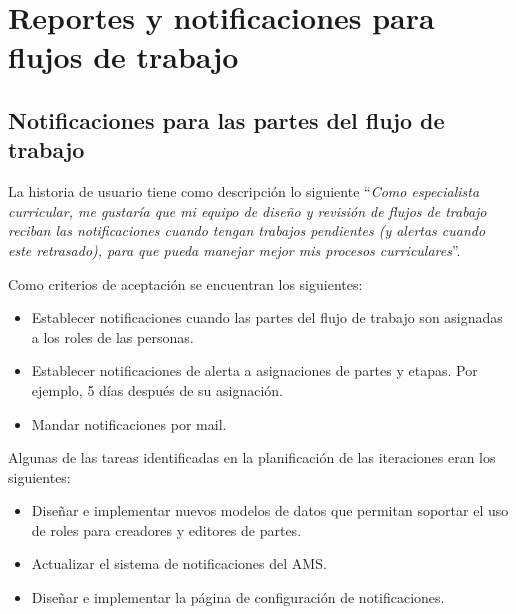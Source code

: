 \section{Reportes y notificaciones para flujos de trabajo}
\begin{table}[H]
\centering
{}
\caption{Historias de usuario para los reportes y notificaciones de versiones de cursos}
\label{epic:9}
\end{table}

\subsection{Notificaciones para las partes del flujo de trabajo}
La historia de usuario tiene como descripción lo siguiente \enquote{\textit{Como especialista curricular, me gustaría que mi equipo de diseño y revisión de flujos de trabajo reciban las notificaciones cuando tengan trabajos pendientes (y alertas cuando este retrasado), para que pueda manejar mejor mis procesos curriculares}}.

Como criterios de aceptación se encuentran los siguientes:
\begin{itemize}
	\item Establecer notificaciones cuando las partes del flujo de trabajo son asignadas a los roles de las personas.
	\item Establecer notificaciones de alerta a asignaciones de partes y etapas. Por ejemplo, 5 días después de su asignación.
	\item Mandar notificaciones por mail.
\end{itemize}

Algunas de las tareas identificadas en la planificación de las iteraciones eran los siguientes:
\begin{itemize}
	\item Diseñar e implementar nuevos modelos de datos que permitan soportar el uso de roles para creadores y editores de partes.
	\item Actualizar el sistema de notificaciones del AMS.
	\item Diseñar e implementar la página de configuración de notificaciones.
\end{itemize}

